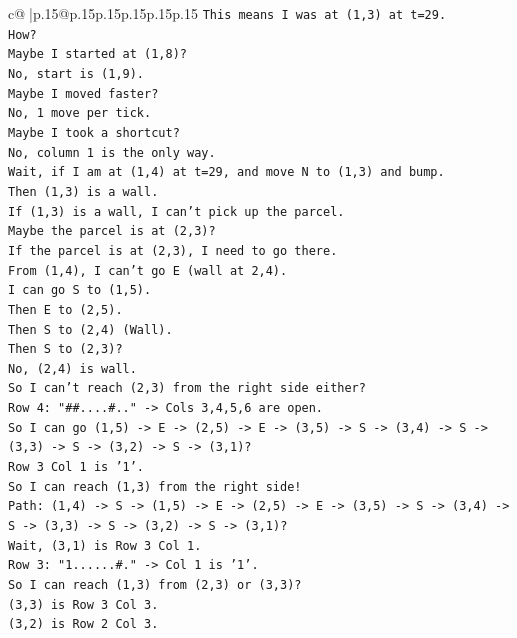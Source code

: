 \documentclass{article}
\begin{document}
{\begin{supertabular}{c@{$\;$}|p{.15\linewidth}@{}p{.15\linewidth}p{.15\linewidth}p{.15\linewidth}p{.15\linewidth}p{.15\linewidth}}
{{{\texttt{This means I was at (1,3) at t=29.} \\
\texttt{How?} \\
\texttt{Maybe I started at (1,8)?} \\
\texttt{No, start is (1,9).} \\
\texttt{Maybe I moved faster?} \\
\texttt{No, 1 move per tick.} \\
\texttt{Maybe I took a shortcut?} \\
\texttt{No, column 1 is the only way.} \\
\texttt{Wait, if I am at (1,4) at t=29, and move N to (1,3) and bump.} \\
\texttt{Then (1,3) is a wall.} \\
\texttt{If (1,3) is a wall, I can't pick up the parcel.} \\
\texttt{Maybe the parcel is at (2,3)?} \\
\texttt{If the parcel is at (2,3), I need to go there.} \\
\texttt{From (1,4), I can't go E (wall at 2,4).} \\
\texttt{I can go S to (1,5).} \\
\texttt{Then E to (2,5).} \\
\texttt{Then S to (2,4) (Wall).} \\
\texttt{Then S to (2,3)?} \\
\texttt{No, (2,4) is wall.} \\
\texttt{So I can't reach (2,3) from the right side either?} \\
\texttt{Row 4: "\#\#....\#.." {-}> Cols 3,4,5,6 are open.} \\
\texttt{So I can go (1,5) {-}> E {-}> (2,5) {-}> E {-}> (3,5) {-}> S {-}> (3,4) {-}> S {-}> (3,3) {-}> S {-}> (3,2) {-}> S {-}> (3,1)?} \\
\texttt{Row 3 Col 1 is '1'.} \\
\texttt{So I can reach (1,3) from the right side!} \\
\texttt{Path: (1,4) {-}> S {-}> (1,5) {-}> E {-}> (2,5) {-}> E {-}> (3,5) {-}> S {-}> (3,4) {-}> S {-}> (3,3) {-}> S {-}> (3,2) {-}> S {-}> (3,1)?} \\
\texttt{Wait, (3,1) is Row 3 Col 1.} \\
\texttt{Row 3: "1......\#." {-}> Col 1 is '1'.} \\
\texttt{So I can reach (1,3) from (2,3) or (3,3)?} \\
\texttt{(3,3) is Row 3 Col 3.} \\
\texttt{(3,2) is Row 2 Col 3.} \\
}}}
\end{supertabular}}
\end{document}
